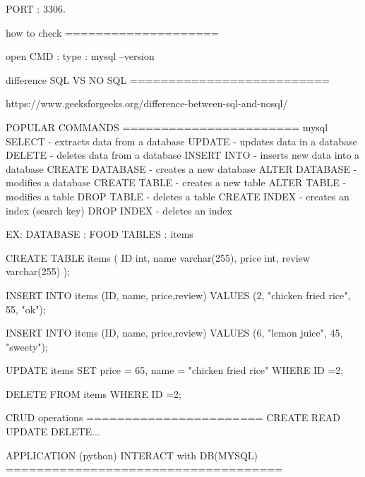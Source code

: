 PORT : 3306. 

how to check 
====================

open CMD :
	type : mysql --version

difference SQL VS NO SQL 
==========================

https://www.geeksforgeeks.org/difference-between-sql-and-nosql/



POPULAR COMMANDS
=======================
mysql 
SELECT - extracts data from a database
UPDATE - updates data in a database
DELETE - deletes data from a database
INSERT INTO - inserts new data into a database
CREATE DATABASE - creates a new database
ALTER DATABASE - modifies a database
CREATE TABLE - creates a new table
ALTER TABLE - modifies a table
DROP TABLE - deletes a table
CREATE INDEX - creates an index (search key)
DROP INDEX - deletes an index


EX:
	DATABASE : FOOD 
	TABLES : items 
	
CREATE TABLE items (
    ID int,
    name varchar(255),
    price int,
    review varchar(255)
);

INSERT INTO items (ID, name, price,review)
VALUES (2, "chicken fried rice", 55, "ok");

INSERT INTO items (ID, name, price,review)
VALUES (6, "lemon juice", 45, "sweety");


UPDATE items
SET price = 65, name = "chicken fried rice"
WHERE ID =2;



DELETE FROM items WHERE ID =2;
	
	
CRUD operations 
=======================
CREATE READ UPDATE DELETE...


APPLICATION (python) INTERACT with DB(MYSQL)
====================================


